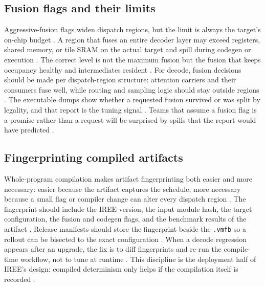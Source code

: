\subsection{Fusion flags and their limits}

Aggressive-fusion flags widen dispatch regions, but the limit is always the target's on-chip budget \citep{iree2024,memoryfloor2026}. A region that fuses an entire decoder layer may exceed registers, shared memory, or tile SRAM on the actual target and spill during codegen or execution \citep{nvidia2022hopper,amd2024aie,dao2022flashattention}. The correct level is not the maximum fusion but the fusion that keeps occupancy healthy and intermediates resident \citep{taxbreak2026,memoryfloor2026}. For decode, fusion decisions should be made per dispatch-region structure: attention carriers and their consumers fuse well, while routing and sampling logic should stay outside regions \citep{dao2022flashattention,liu2024deepseekv3}. The executable dumps show whether a requested fusion survived or was split by legality, and that report is the tuning signal \citep{iree2024,patel2025llminference}. Teams that assume a fusion flag is a promise rather than a request will be surprised by spills that the report would have predicted \citep{memoryfloor2026,chen2020compilerbasedhardw}.

\subsection{Fingerprinting compiled artifacts}

Whole-program compilation makes artifact fingerprinting both easier and more necessary: easier because the artifact captures the schedule, more necessary because a small flag or compiler change can alter every dispatch region \citep{iree2024,chen2020compilerbasedhardw}. The fingerprint should include the IREE version, the input module hash, the target configuration, the fusion and codegen flags, and the benchmark results of the artifact \citep{memoryfloor2026,patel2025llminference}. Release manifests should store the fingerprint beside the \texttt{.vmfb} so a rollout can be bisected to the exact configuration \citep{taxbreak2026,chen2020compilerbasedhardw}. When a decode regression appears after an upgrade, the fix is to diff fingerprints and re-run the compile-time workflow, not to tune at runtime \citep{memoryfloor2026,patel2025llminference}. This discipline is the deployment half of IREE's design: compiled determinism only helps if the compilation itself is recorded \citep{iree2024,taxbreak2026}.


